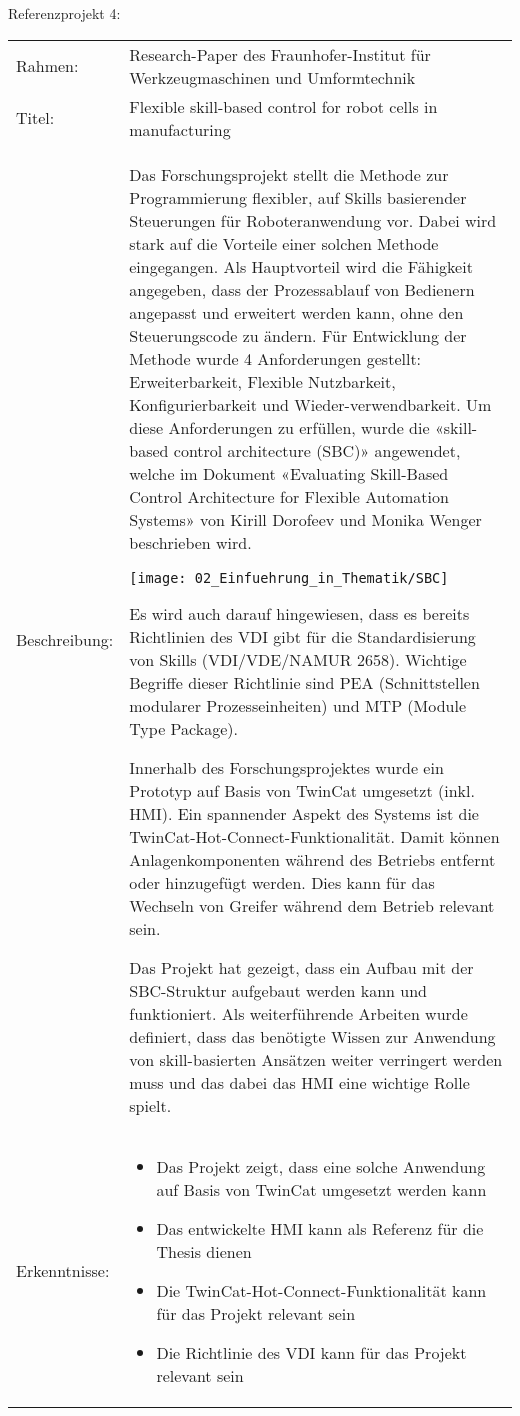 		\newpage
	
	Referenzprojekt 4:
	\vspace{2mm}
	\\
		\begin{tabularx}{\textwidth}{@{}>{}p{8em} X@{}}
		Rahmen: & 
		Research-Paper des Fraunhofer-Institut für Werkzeugmaschinen und Umformtechnik 
		\\
		
		Titel: & 
		Flexible skill-based control for robot cells in manufacturing
		\\
		
		Beschreibung: & 
		Das Forschungsprojekt stellt die Methode zur Programmierung flexibler, auf Skills basierender Steuerungen für Roboteranwendung vor. Dabei wird stark auf die Vorteile einer solchen Methode eingegangen. Als Hauptvorteil wird die Fähigkeit angegeben, dass der Prozessablauf von Bedienern angepasst und erweitert werden kann, ohne den Steuerungscode zu ändern. Für Entwicklung der Methode wurde 4 Anforderungen gestellt: Erweiterbarkeit, Flexible Nutzbarkeit, Konfigurierbarkeit und Wieder-verwendbarkeit. Um diese Anforderungen zu erfüllen, wurde die «skill-based control architecture (SBC)» angewendet, welche im Dokument «Evaluating Skill-Based Control Architecture for Flexible Automation Systems» von Kirill Dorofeev und Monika Wenger beschrieben wird. 
		
		\texttt{[image: 02\_Einfuehrung\_in\_Thematik/SBC]}
		
		Es wird auch darauf hingewiesen, dass es bereits Richtlinien des VDI gibt für die Standardisierung von Skills (VDI/VDE/NAMUR 2658). Wichtige Begriffe dieser Richtlinie sind PEA (Schnittstellen modularer Prozesseinheiten) und MTP (Module Type Package).
		
		Innerhalb des Forschungsprojektes wurde ein Prototyp auf Basis von TwinCat umgesetzt (inkl. HMI). Ein spannender Aspekt des Systems ist die TwinCat-Hot-Connect-Funktionalität. Damit können Anlagenkomponenten während des Betriebs entfernt oder hinzugefügt werden. Dies kann für das Wechseln von Greifer während dem Betrieb relevant sein. 
		
		Das Projekt hat gezeigt, dass ein Aufbau mit der SBC-Struktur aufgebaut werden kann und funktioniert. Als weiterführende Arbeiten wurde definiert, dass das benötigte Wissen zur Anwendung von skill-basierten Ansätzen weiter verringert werden muss und das dabei das HMI eine wichtige Rolle spielt. 
		\\
		
		Erkenntnisse: & 
		\begin{itemize}
			\item Das Projekt zeigt, dass eine solche Anwendung auf Basis von TwinCat umgesetzt werden kann
			\item Das entwickelte HMI kann als Referenz für die Thesis dienen
			\item Die TwinCat-Hot-Connect-Funktionalität kann für das Projekt relevant sein
			\item Die Richtlinie des VDI kann für das Projekt relevant sein
		\end{itemize}
	\end{tabularx}
	

